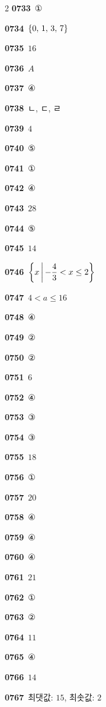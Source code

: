\documentclass[10pt,a4paper]{article}
\begin{document}
\begin{multicols}{2}
\noindent\textbf{0733}\ ①\par
\noindent\textbf{0734}\ $\{0,\mkern3mu 1,\mkern3mu 3,\mkern3mu 7\}$\par
\noindent\textbf{0735}\ $16$\par
\noindent\textbf{0736}\ $A$\par
\noindent\textbf{0737}\ ④\par
\noindent\textbf{0738}\ ㄴ, ㄷ, ㄹ\par
\noindent\textbf{0739}\ $4$\par
\noindent\textbf{0740}\ ⑤\par
\noindent\textbf{0741}\ ①\par
\noindent\textbf{0742}\ ④\par
\noindent\textbf{0743}\ $28$\par
\noindent\textbf{0744}\ ⑤\par
\noindent\textbf{0745}\ $14$\par
\noindent\textbf{0746}\ $\left\{x \mkern3mu \middle|\mkern3mu  -\dfrac{4}{3}<x\le 2\right\}$\par
\noindent\textbf{0747}\ $4<a\le 16$\par
\noindent\textbf{0748}\ ④\par
\noindent\textbf{0749}\ ②\par
\noindent\textbf{0750}\ ②\par
\noindent\textbf{0751}\ $6$\par
\noindent\textbf{0752}\ ④\par
\noindent\textbf{0753}\ ③\par
\noindent\textbf{0754}\ ③\par
\noindent\textbf{0755}\ $18$\par
\noindent\textbf{0756}\ ①\par
\noindent\textbf{0757}\ $20$\par
\noindent\textbf{0758}\ ④\par
\noindent\textbf{0759}\ ④\par
\noindent\textbf{0760}\ ④\par
\noindent\textbf{0761}\ $21$\par
\noindent\textbf{0762}\ ①\par
\noindent\textbf{0763}\ ②\par
\noindent\textbf{0764}\ $11$\par
\noindent\textbf{0765}\ ④\par
\noindent\textbf{0766}\ $14$\par
\noindent\textbf{0767}\ 최댓값: $15$, 최솟값: $2$\par

\end{multicols}
\end{document}
